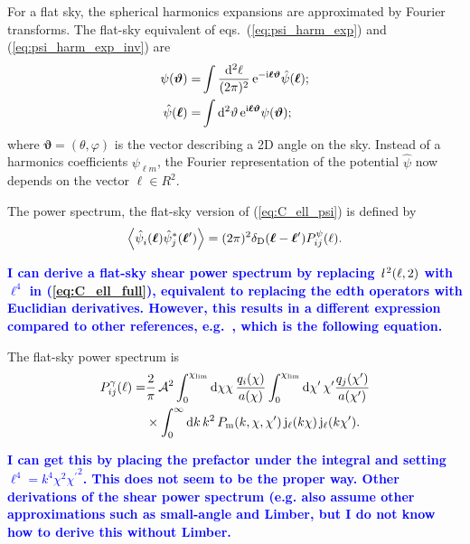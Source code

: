 \documentclass[fleqn,usenatbib]{mnras} %
\newcommand{\ellbar}{\hbox{\it \l}\,}
\newcommand{\pref}{{\cal A}}
\renewcommand{\vec}{\bm}
\newcommand{\mk}[1]{{\bf\textcolor{blue}{#1}}}
\begin{document}
For a flat sky, the spherical harmonics expansions are approximated by Fourier
transforms. The flat-sky equivalent of eqs.~(\ref{eq:psi_harm_exp}) and
(\ref{eq:psi_harm_exp_inv}) are
%
\begin{align}
  \psi(\vec \vartheta) = & \int \frac{{\rm d}^2 \ell}{(2\pi)^2} \, {\rm e}^{-{\rm i} \vec \ell \vec \vartheta} \hat \psi(\vec \ell);
  \label{eq:psi_fourier}
  \\
  \hat \psi(\vec \ell) = & \int {\rm d}^2 \vartheta \, {\rm e}^{{\rm i} \vec \ell \vec \vartheta} \psi(\vec \vartheta);
  \label{eq:psi_fourier_inv}
\end{align}
%
where $\vec \vartheta = (\theta, \varphi)$ is the vector describing a 2D angle on the sky.
Instead of a harmonics coefficients $\psi_{\ell m}$, the Fourier representation of the potential
$\hat \psi$ now depends on the vector $\vec \ell \in R^2$.

The power spectrum, the flat-sky version of
(\ref{eq:C_ell_psi}) is defined by
%
\begin{equation}
  \left\langle \hat \psi_i^{}(\vec \ell) \hat \psi_j^\ast(\vec \ell^\prime) \right\rangle
    = (2\pi)^2 \delta_{\rm D}(\vec \ell - \vec \ell^\prime) P^\psi_{ij}(\ell).
  \label{eq:P_ell_psi}
\end{equation}


\mk{I can derive a flat-sky shear power spectrum by replacing $\ellbar^2(\ell, 2)$ with $\ell^4$
in (\ref{eq:C_ell_full}), equivalent to replacing the edth operators with Euclidian derivatives.
However, this results in a different expression compared to other references, e.g.~\cite{2008PhRvD..78d3002S},
which is the following equation.}

The flat-sky power spectrum is
%
\begin{align}
  P_{ij}^\gamma(\ell) = & \frac 2 \pi \, \pref^2
                 \int_{0}^{\chi_{\rm lim}} {\rm d} \chi \chi \, \frac{q_i(\chi)}{a(\chi)}
                \int_{0}^{\chi_{\rm lim}} {\rm d} \chi^\prime\, \chi^\prime
                \frac{q_j(\chi^\prime)}{a(\chi^\prime)}
                \nonumber \\
                & \times \int_0^\infty {\rm d} k \, k^2 \, P_{\rm m}(k, \chi, \chi^\prime) \,
                {\rm j}_\ell(k \chi) \, {\rm j}_\ell(k \chi^\prime) .
  \label{eq:P_ell_gamma}
\end{align}
%

\mk{I can get this by placing the prefactor under the integral and
setting $\ell^4 = k^4 \chi^2 {\chi^\prime}^2$. This does not seem to be the proper way.
Other derivations of the shear power spectrum (e.g.\cite{BS01} also assume other approximations
such as small-angle and Limber, but I do not know how to derive this without Limber.}
\end{document}
